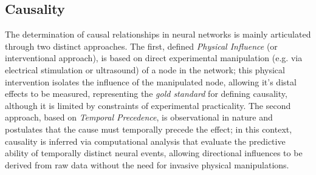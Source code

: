 \documentclass[10pt, letterpaper]{report}
\begin{document}
\subsection{Causality}

The determination of causal relationships in neural networks is mainly articulated through two distinct approaches. The first, defined \textit{Physical Influence} (or interventional approach), is based on direct experimental manipulation (e.g. via electrical stimulation or ultrasound) of a node in the network; this physical intervention isolates the influence of the manipulated node, allowing it's distal effects to be measured, representing the \textit{gold standard} for defining causality, although it is limited by constraints of experimental practicality. The second approach, based on \textit{Temporal Precedence}, is observational in nature and postulates that the cause must temporally precede the effect; in this context, causality is inferred via computational analysis that evaluate the predictive ability of temporally distinct neural events, allowing directional influences to be derived from raw data without the need for invasive physical manipulations.\bigskip
\end{document}
